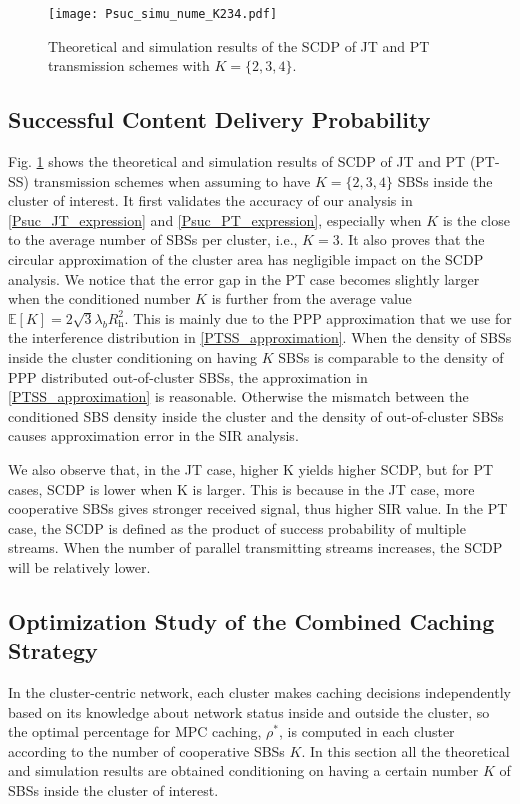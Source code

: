 \documentclass[twocolumns,10pt]{IEEEtran}
\begin{document}
\begin{figure}
	\centering
	\texttt{[image: Psuc\_simu\_nume\_K234.pdf]}
	\caption{Theoretical and simulation results of the SCDP of JT and PT transmission schemes with $K=\{2, 3, 4\}$.}
	\label{Psuc_simu_nume_K234}
\end{figure}

\subsection{Successful Content Delivery Probability}
Fig. \ref{Psuc_simu_nume_K234} shows the theoretical and simulation results of SCDP of JT and PT (PT-SS) transmission schemes when assuming to have $K=\{2,3,4\}$ SBSs inside the cluster of interest. It first validates the accuracy of our analysis in \eqref{Psuc_JT_expression} and \eqref{Psuc_PT_expression}, especially when $K$ is the close to the average number of SBSs per cluster, i.e., $K=3$. It also proves that the circular approximation of the cluster area has negligible impact on the SCDP analysis. We notice that the error gap in the PT case becomes slightly larger when the conditioned number $K$ is further from the average value $\mathbb{E}[K]=2\sqrt{3}\lambda_b R_{\text{h}}^2$. This is mainly due to the PPP approximation that we use for the interference distribution in \eqref{PTSS_approximation}. When the density of SBSs inside the cluster conditioning on having $K$ SBSs is comparable to the density of PPP distributed out-of-cluster SBSs, the approximation in \eqref{PTSS_approximation} is reasonable. Otherwise the mismatch between the conditioned SBS density inside the cluster and the density of out-of-cluster SBSs causes approximation error in the SIR analysis.  

We also observe that, in the JT case,  higher K yields higher SCDP, but for PT cases, SCDP is lower when K is larger. This is because in the JT case, more cooperative SBSs gives stronger received signal, thus higher SIR value. In the PT case, the SCDP is defined as the product of success probability of multiple streams. When the number of parallel transmitting streams increases, the SCDP will be relatively lower.  

\subsection{Optimization Study of the Combined Caching Strategy}
In the cluster-centric network,  each cluster makes caching decisions independently based on its knowledge about network status inside and outside the cluster, so the optimal percentage  for MPC caching, $\rho^{*}$, is computed in each cluster according to the number of cooperative SBSs $K$.
In this section all the theoretical and simulation results are obtained conditioning on having a certain number $K$ of SBSs inside the cluster of interest.
 
\end{document}
